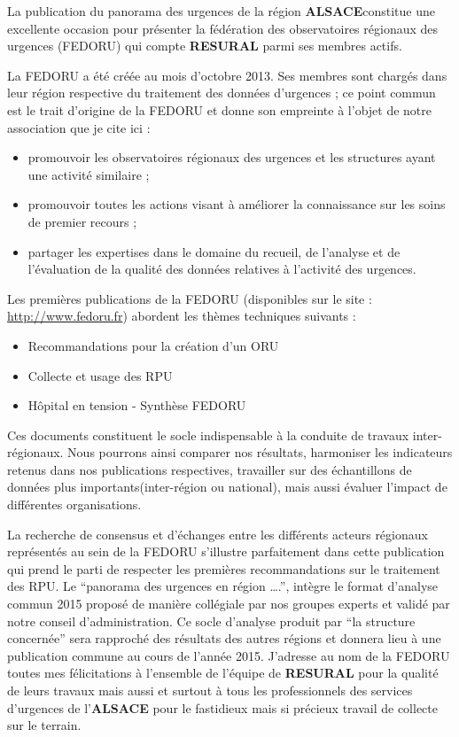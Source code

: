 \documentclass[]{article}
\begin{document}
La publication du panorama des urgences de la région
\textbf{ALSACE}constitue une excellente occasion pour présenter la
fédération des observatoires régionaux des urgences (FEDORU) qui compte
\textbf{RESURAL} parmi ses membres actifs.

La FEDORU a été créée au mois d'octobre 2013. Ses membres sont chargés
dans leur région respective du traitement des données d'urgences ; ce
point commun est le trait d'origine de la FEDORU et donne son empreinte
à l'objet de notre association que je cite ici :

\begin{itemize}
\itemsep1pt\parskip0pt
\item
  promouvoir les observatoires régionaux des urgences et les structures
  ayant une activité similaire ;
\item
  promouvoir toutes les actions visant à améliorer la connaissance sur
  les soins de premier recours ;
\item
  partager les expertises dans le domaine du recueil, de l'analyse et de
  l'évaluation de la qualité des données relatives à l'activité des
  urgences.
\end{itemize}

Les premières publications de la FEDORU (disponibles sur le site :
\url{http://www.fedoru.fr}) abordent les thèmes techniques suivants :

\begin{itemize}
\itemsep1pt\parskip0pt
\item
  Recommandations pour la création d'un ORU
\item
  Collecte et usage des RPU
\item
  Hôpital en tension - Synthèse FEDORU
\end{itemize}

Ces documents constituent le socle indispensable à la conduite de
travaux inter-régionaux. Nous pourrons ainsi comparer nos résultats,
harmoniser les indicateurs retenus dans nos publications respectives,
travailler sur des échantillons de données plus importants(inter-région
ou national), mais aussi évaluer l'impact de différentes organisations.

La recherche de consensus et d'échanges entre les différents acteurs
régionaux représentés au sein de la FEDORU s'illustre parfaitement dans
cette publication qui prend le parti de respecter les premières
recommandations sur le traitement des RPU. Le ``panorama des urgences en
région \ldots{}.'', intègre le format d'analyse commun 2015 proposé de
manière collégiale par nos groupes experts et validé par notre conseil
d'administration. Ce socle d'analyse produit par ``la structure
concernée'' sera rapproché des résultats des autres régions et donnera
lieu à une publication commune au cours de l'année 2015. J'adresse au
nom de la FEDORU toutes mes félicitations à l'ensemble de l'équipe de
\textbf{RESURAL} pour la qualité de leurs travaux mais aussi et surtout
à tous les professionnels des services d'urgences de l'\textbf{ALSACE}
pour le fastidieux mais si précieux travail de collecte sur le terrain.
\end{document}
